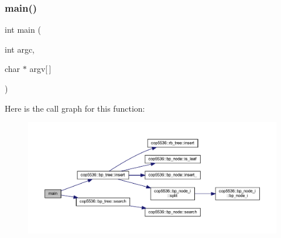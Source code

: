 \subsubsection{main()}
{\footnotesize\ttfamily int main (\begin{DoxyParamCaption}\item[{int}]{argc,  }\item[{char $\ast$}]{argv[$\,$] }\end{DoxyParamCaption})}

Here is the call graph for this function\+:
\nopagebreak
\begin{figure}[H]
\begin{center}
\leavevmode
\includegraphics[width=350pt]{main_8cc_a0ddf1224851353fc92bfbff6f499fa97_cgraph}
\end{center}
\end{figure}

